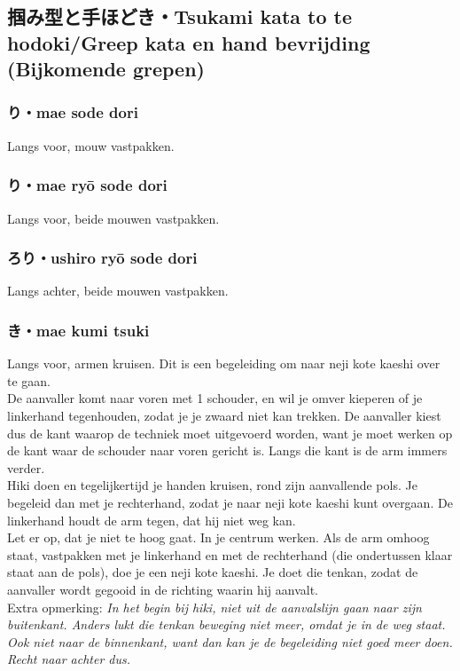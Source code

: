 \subsection{掴み型と手ほどき・Tsukami kata to te hodoki/Greep kata en hand bevrijding (Bijkomende grepen)}
\subsubsection{り・mae sode dori}
Langs voor, mouw vastpakken.

\subsubsection{り・mae ry\={o} sode dori}
Langs voor, beide mouwen vastpakken.

\subsubsection{ろり・ushiro ry\={o} sode dori}
Langs achter, beide mouwen vastpakken.

\subsubsection{き・mae kumi tsuki}
Langs voor, armen kruisen. Dit is een begeleiding om naar neji kote kaeshi over te gaan.\\
De aanvaller komt naar voren met 1 schouder, en wil je omver kieperen of je linkerhand tegenhouden, zodat je je zwaard niet kan trekken. De aanvaller kiest dus de kant waarop de techniek moet uitgevoerd worden, want je moet werken op de kant waar de schouder naar voren gericht is. Langs die kant is de arm immers verder.\\
Hiki doen en tegelijkertijd je handen kruisen, rond zijn aanvallende pols. Je begeleid dan met je rechterhand, zodat je naar neji kote kaeshi kunt overgaan. De linkerhand houdt de arm tegen, dat hij niet weg kan.\\
Let er op, dat je niet te hoog gaat. In je centrum werken. Als de arm omhoog staat, vastpakken met je linkerhand en met de rechterhand (die ondertussen klaar staat aan de pols), doe je een neji kote kaeshi. Je doet die tenkan, zodat de aanvaller wordt gegooid in de richting waarin hij aanvalt.\\
Extra opmerking: \textit{In het begin bij hiki, niet uit de aanvalslijn gaan naar zijn buitenkant. Anders lukt die tenkan beweging niet meer, omdat je in de weg staat. Ook niet naar de binnenkant, want dan kan je de begeleiding niet goed meer doen. Recht naar achter dus.}

